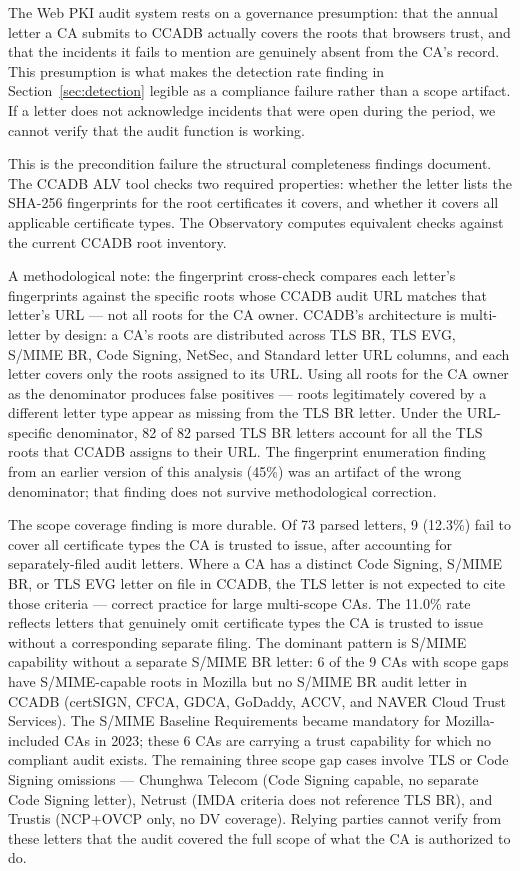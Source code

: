\documentclass[10pt,twocolumn,letterpaper]{article}
\begin{document}
The Web PKI audit system rests on a governance presumption: that the
annual letter a CA submits to CCADB actually covers the roots that
browsers trust, and that the incidents it fails to mention are
genuinely absent from the CA's record. This presumption is what makes
the detection rate finding in Section~\ref{sec:detection} legible as
a compliance failure rather than a scope artifact. If a letter does
not acknowledge incidents that were open during the period, we cannot
verify that the audit function is working.

This is the precondition failure the structural completeness findings
document. The CCADB ALV tool checks two required properties:
whether the letter lists the SHA-256 fingerprints for the root
certificates it covers, and whether it covers all applicable
certificate types. The Observatory computes equivalent checks against
the current CCADB root inventory.

A methodological note: the fingerprint cross-check compares each
letter's fingerprints against the specific roots whose CCADB audit URL
matches that letter's URL --- not all roots for the CA owner. CCADB's
architecture is multi-letter by design: a CA's roots are distributed
across TLS BR, TLS EVG, S/MIME BR, Code Signing, NetSec, and Standard
letter URL columns, and each letter covers only the roots assigned to
its URL. Using all roots for the CA owner as the denominator produces
false positives --- roots legitimately covered by a different letter
type appear as missing from the TLS BR letter. Under the URL-specific
denominator, 82 of 82 parsed TLS BR letters account for all the TLS
roots that CCADB assigns to their URL. The fingerprint enumeration
finding from an earlier version of this analysis (45\%) was an artifact
of the wrong denominator; that finding does not survive methodological
correction.

The scope coverage finding is more durable. Of 73 parsed letters,
9 (12.3\%) fail to cover all certificate types the CA is trusted to
issue, after accounting for separately-filed audit letters. Where a CA
has a distinct Code Signing, S/MIME BR, or TLS EVG letter on file in
CCADB, the TLS letter is not expected to cite those criteria --- correct
practice for large multi-scope CAs. The 11.0\% rate reflects letters
that genuinely omit certificate types the CA is trusted to issue without
a corresponding separate filing. The dominant pattern is S/MIME
capability without a separate S/MIME BR letter: 6 of the 9 CAs with
scope gaps have S/MIME-capable roots in Mozilla but no S/MIME BR audit letter in
CCADB (certSIGN, CFCA, GDCA, GoDaddy, ACCV, and NAVER Cloud Trust Services).
The S/MIME Baseline Requirements became mandatory for Mozilla-included CAs in 2023; these
6 CAs are carrying a trust capability for which no compliant audit
exists. The remaining three scope gap cases involve TLS or Code Signing omissions ---
Chunghwa Telecom (Code Signing capable, no separate Code Signing letter),
Netrust (IMDA criteria does not reference TLS BR), and Trustis (NCP+OVCP only,
no DV coverage). Relying parties cannot verify from these letters that
the audit covered the full scope of what the CA is authorized to do.
\end{document}
